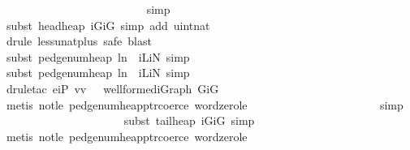 \begin{isabellebody}
\ \ \ \ \ \ \ \ \ \ \ \ \ \ \ \ \ \ \ \ \ \ \ \ \isamarkupfalse%
\ simp{\isacharplus}\isanewline
\ \ \ \ \ \ \ \ \ \ \ \ \ \ \ \ \ \ \ \ \ \isamarkupfalse%
\ {\isacharparenleft}subst\ head{\isacharunderscore}heap{\isacharbrackleft}\ iG{\isacharequal}iG{\isacharbrackright}{\isacharcomma}\ {\isacharparenleft}simp\ add{\isacharcolon}\ uint{\isacharunderscore}nat{\isacharparenright}{\isacharplus}{\isacharparenright}\isanewline
\ \ \ \ \ \ \ \ \ \ \ \ \ \ \ \ \ \ \ \ \isamarkupfalse%
\ {\isacharparenleft}drule\ less{\isacharunderscore}unat{\isacharunderscore}plus{}{\isacharcomma}\ safe{\isacharcomma}\ blast{\isacharparenright}\isanewline
\ \ \ \ \ \ \ \ \ \ \ \ \ \ \ \ \ \ \ \ \isamarkupfalse%
\ {\isacharparenleft}subst\ pedge{\isacharunderscore}num{\isacharunderscore}heap{\isacharbrackleft}\ l{\isacharequal}n\ \ iL{\isacharequal}iN{\isacharbrackright}{\isacharcomma}\ simp{\isacharplus}{\isacharparenright}\ \isanewline
\ \ \ \ \ \ \ \ \ \ \ \ \ \ \ \ \ \ \ \ \isamarkupfalse%
\ {\isacharparenleft}subst\ pedge{\isacharunderscore}num{\isacharunderscore}heap{\isacharbrackleft}\ l{\isacharequal}n\ \ iL{\isacharequal}iN{\isacharbrackright}{\isacharcomma}\ simp{\isacharparenright}\isanewline
\ \ \ \ \ \ \ \ \ \ \ \ \ \ \ \ \ \ \ \ \ \isamarkupfalse%
\ {\isacharparenleft}drule{\isacharunderscore}tac\ e{\isacharequal}{\isachardoublequoteopen}iP\ vv{\isachardoublequoteclose}\ \ \ wellformed{\isacharunderscore}iGraph{\isacharbrackleft}\ G{\isacharequal}iG{\isacharbrackright}{\isacharparenright}\isanewline
\ \ \ \ \ \ \ \ \ \ \ \ \ \ \ \ \ \ \ \ \ \ \isamarkupfalse%
\ {\isacharparenleft}metis\ not{\isacharunderscore}le\ pedge{\isacharunderscore}num{\isacharunderscore}heap{\isacharunderscore}ptr{\isacharunderscore}coerce\ word{\isacharunderscore}zero{\isacharunderscore}le{\isacharparenright}\isanewline
\ \ \ \ \ \ \ \ \ \ \ \ \ \ \ \ \ \ \ \ \ \isamarkupfalse%
\ simp\isanewline
\ \ \ \ \ \ \ \ \ \ \ \ \ \ \ \ \ \ \ \ \isamarkupfalse%
\ {\isacharparenleft}subst\ tail{\isacharunderscore}heap{\isacharbrackleft}\ iG{\isacharequal}iG{\isacharbrackright}{\isacharcomma}\ simp{\isacharplus}{\isacharparenright}\ \isanewline
\ \ \ \ \ \ \ \ \ \ \ \ \ \ \ \ \ \ \ \ \ \isamarkupfalse%
\ {\isacharparenleft}metis\ not{\isacharunderscore}le\ pedge{\isacharunderscore}num{\isacharunderscore}heap{\isacharunderscore}ptr{\isacharunderscore}coerce\ word{\isacharunderscore}zero{\isacharunderscore}le{\isacharparenright}\isanewline

\end{isabellebody}
